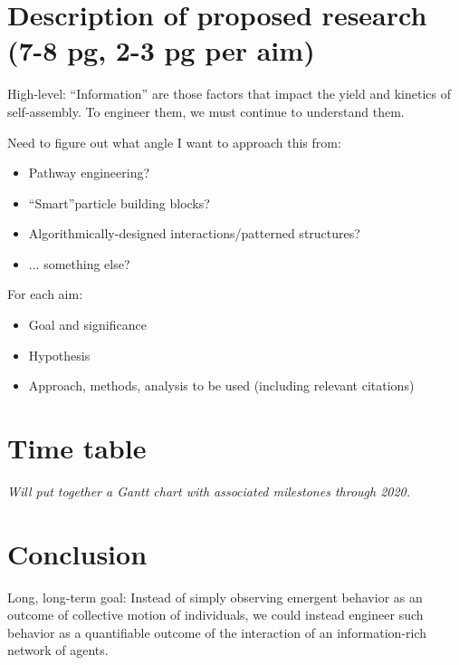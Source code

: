 \documentclass[11pt, oneside]{article}   	%
\begin{document}
\section{Description of proposed research (7-8 pg, 2-3 pg per aim)}

High-level: ``Information'' are those factors that impact the yield and kinetics of self-assembly. To engineer them, we must continue to understand them.

Need to figure out what angle I want to approach this from:
\begin{itemize}
\item Pathway engineering?
\item``Smart''particle building blocks?
\item Algorithmically-designed interactions/patterned structures?
\item ... something else?
\end{itemize}

For each aim:
\begin{itemize}
\item Goal and significance
\item Hypothesis
\item Approach, methods, analysis to be used (including relevant citations)
\end{itemize}

\section{Time table}
\textit{Will put together a Gantt chart with associated milestones through 2020.}

\section{Conclusion}
Long, long-term goal: Instead of simply observing emergent behavior as an outcome of collective motion of individuals, we could instead engineer such behavior as a quantifiable outcome of the interaction of an information-rich network of agents.
\end{document}
